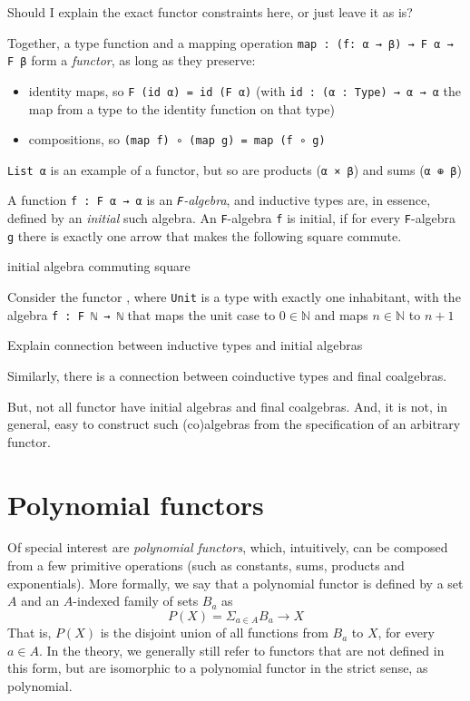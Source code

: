 \documentclass[titlepage]{report}
\newenvironment{todo}{%
\definecolor{shadecolor}{HTML}{F8E0E0}%
\begin{shaded}%
\begin{trivlist}                         
    \item[\hskip \labelsep {\bfseries Todo:}]}{\end{trivlist}\end{shaded}}
\begin{document}
\begin{todo}
    Should I explain the exact functor constraints here, or just leave it as is?
\end{todo}

Together, a type function  and a mapping operation \texttt{map : (f: α → β) → F α → F β} form a \emph{functor}, as long as they preserve: 
\begin{itemize}
    \item identity maps, so \texttt{F (id α) = id (F α)} (with \texttt{id : (α : Type) → α → α} the map from a type to the identity function on that type)
    \item compositions, so \texttt{(map f) ∘ (map g) = map (f ∘ g)}
\end{itemize}
\texttt{List α} is an example of a functor, but so are products (\texttt{α × β}) and sums 
(\texttt{α ⊕ β})

A function \texttt{f : F α → α} is an \emph{\texttt{F}-algebra}, and inductive types are, in essence, defined by an \emph{initial} such algebra. An \texttt{F}-algebra \texttt{f} is initial, if for every \texttt{F}-algebra \texttt{g} there is exactly one arrow that makes the following square commute.
\begin{todo}
    initial algebra commuting square
\end{todo}

Consider the functor , where \texttt{Unit} is a type with exactly one inhabitant, with the algebra \texttt{f : F ℕ → ℕ} that maps the unit case to $0 ∈ \mathbb{N}$ and maps $n ∈ ℕ$ to $n + 1$

\begin{todo}
    Explain connection between inductive types and initial algebras
\end{todo}

Similarly, there is a connection between coinductive types and final coalgebras.

But, not all functor have initial algebras and final coalgebras. And, it is not, in general, easy to construct such (co)algebras from the specification of an arbitrary functor.


\section{Polynomial functors}
Of special interest are \emph{polynomial functors}, which, intuitively, can be composed from a few primitive operations (such as constants, sums, products and exponentials).
More formally, we say that a polynomial functor is defined by a set $A$ and an $A$-indexed family of sets $B_a$ as
\[
    P(X) = \Sigma_{a ∈ A} B_a \rightarrow X  
\]
That is, $P(X)$ is the disjoint union of all functions from $B_a$ to $X$, for every $a ∈ A$.
In the theory, we generally still refer to functors that are not defined in this form, but are isomorphic to a polynomial functor in the strict sense, as polynomial.
\end{document}
